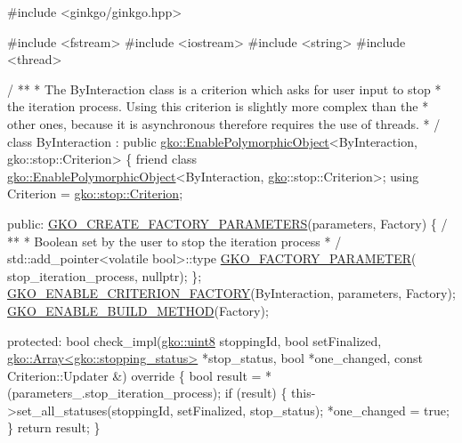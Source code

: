 \begin{DoxyCode}
\textcolor{preprocessor}{#include <ginkgo/ginkgo.hpp>}


\textcolor{preprocessor}{#include <fstream>}
\textcolor{preprocessor}{#include <iostream>}
\textcolor{preprocessor}{#include <string>}
\textcolor{preprocessor}{#include <thread>}


/ **
 * The ByInteraction \textcolor{keyword}{class }is a criterion which asks for user input to stop
 * the iteration process. Using \textcolor{keyword}{this} criterion is slightly more complex than the
 * other ones, because it is asynchronous therefore requires the use of threads.
 * /
\textcolor{keyword}{class }ByInteraction
    : \textcolor{keyword}{public} \hyperlink{classgko_1_1EnablePolymorphicObject}{gko::EnablePolymorphicObject}<ByInteraction, gko::stop::Criterion>
       \{
    \textcolor{keyword}{friend} \textcolor{keyword}{class }\hyperlink{classgko_1_1EnablePolymorphicObject}{gko::EnablePolymorphicObject}<ByInteraction,
                                              \hyperlink{namespacegko}{gko}::stop::Criterion>;
    using Criterion = \hyperlink{classgko_1_1stop_1_1Criterion}{gko::stop::Criterion};

\textcolor{keyword}{public}:
    \hyperlink{group__LinOp_ga1fc8e9d8be0c9ad2d72bc1ddfc6d8358}{GKO\_CREATE\_FACTORY\_PARAMETERS}(parameters, Factory)
    \{
        / **
         * Boolean \textcolor{keyword}{set} by the user to stop the iteration process
         * /
        std::add\_pointer<volatile bool>::type \hyperlink{group__LinOp_gaa037309884bbd0562b897cee95dd91c8}{GKO\_FACTORY\_PARAMETER}(
            stop\_iteration\_process, \textcolor{keyword}{nullptr});
    \};
    \hyperlink{group__stop_ga5a998013602bad749e586a5664670cae}{GKO\_ENABLE\_CRITERION\_FACTORY}(ByInteraction, parameters, Factory);
    \hyperlink{group__LinOp_ga521f65604cc4cf427dcb2ecfa49b757c}{GKO\_ENABLE\_BUILD\_METHOD}(Factory);

\textcolor{keyword}{protected}:
    \textcolor{keywordtype}{bool} check\_impl(\hyperlink{namespacegko_a3950fc3732811a8563484e5098c31531}{gko::uint8} stoppingId, \textcolor{keywordtype}{bool} setFinalized,
                    \hyperlink{classgko_1_1Array}{gko::Array<gko::stopping\_status>} *stop\_status,
                    \textcolor{keywordtype}{bool} *one\_changed, \textcolor{keyword}{const} Criterion::Updater &)\textcolor{keyword}{ override}
\textcolor{keyword}{    }\{
        \textcolor{keywordtype}{bool} result = *(parameters\_.stop\_iteration\_process);
        \textcolor{keywordflow}{if} (result) \{
            this->set\_all\_statuses(stoppingId, setFinalized, stop\_status);
            *one\_changed = \textcolor{keyword}{true};
        \}
        \textcolor{keywordflow}{return} result;
    \}


\end{DoxyCode}
